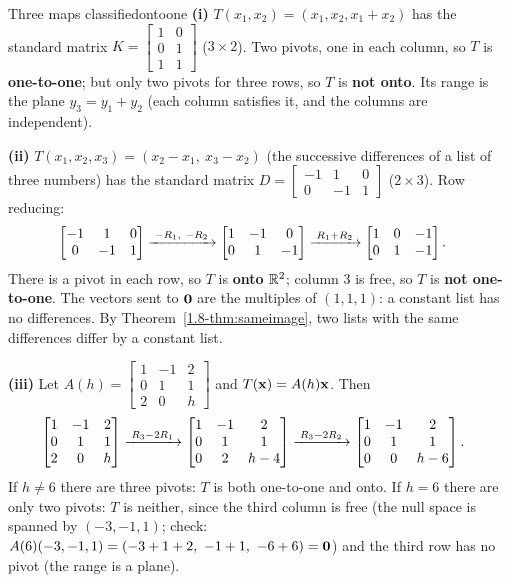 \documentclass[11pt]{article}
\begin{document}
\begin{exmp}{Three maps classified}{ontoone}
\textbf{(i)} $T(x_1,x_2)=(x_1,x_2,x_1+x_2)$ has the standard matrix $K=\begin{bmatrix}1&0\\0&1\\1&1\end{bmatrix}$ ($3\times2$). Two pivots, one in each column, so $T$ is \textbf{one-to-one}; but only two pivots for three rows, so $T$ is \textbf{not onto}. Its range is the plane $y_3=y_1+y_2$ (each column satisfies it, and the columns are independent).

\textbf{(ii)} $T(x_1,x_2,x_3)=(x_2-x_1,\ x_3-x_2)$ (the successive differences of a list of three numbers) has the standard matrix $D=\begin{bmatrix}-1&1&0\\0&-1&1\end{bmatrix}$ ($2\times3$). Row reducing:
\begin{align*}
\begin{bmatrix}-1&1&0\\0&-1&1\end{bmatrix}
&\xrightarrow{\;-R_1,\ -R_2\;}
\begin{bmatrix}1&-1&0\\0&1&-1\end{bmatrix}
\xrightarrow{\;R_1+R_2\;}
\begin{bmatrix}1&0&-1\\0&1&-1\end{bmatrix}.
\end{align*}
There is a pivot in each row, so $T$ is \textbf{onto} $\mathbb{R}^2$; column $3$ is free, so $T$ is \textbf{not one-to-one}. The vectors sent to $\mathbf{0}$ are the multiples of $(1,1,1)$: a constant list has no differences. By Theorem~\ref{1.8-thm:sameimage}, two lists with the same differences differ by a constant list.

\textbf{(iii)} Let $A(h)=\begin{bmatrix}1&-1&2\\0&1&1\\2&0&h\end{bmatrix}$ and $T(\mathbf{x})=A(h)\mathbf{x}$. Then
\begin{align*}
\begin{bmatrix}1&-1&2\\0&1&1\\2&0&h\end{bmatrix}
&\xrightarrow{\;R_3-2R_1\;}
\begin{bmatrix}1&-1&2\\0&1&1\\0&2&h-4\end{bmatrix}
\xrightarrow{\;R_3-2R_2\;}
\begin{bmatrix}1&-1&2\\0&1&1\\0&0&h-6\end{bmatrix}.
\end{align*}
If $h\neq6$ there are three pivots: $T$ is both one-to-one and onto. If $h=6$ there are only two pivots: $T$ is neither, since the third column is free (the null space is spanned by $(-3,-1,1)$; check: $A(6)(-3,-1,1)=(-3+1+2,\ -1+1,\ -6+6)=\bv{0}$) and the third row has no pivot (the range is a plane).
\end{exmp}
\end{document}
